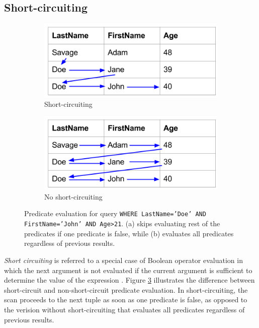 \subsection{Short-circuiting}
\label{sub:Short-circuiting}
\begin{figure}
  \centering
  \begin{subfigure}{0.45\textwidth}
    \includegraphics[width=\textwidth]{img/short-circuiting-1.png}
    \caption{Short-circuiting}
    \label{fig:short-circuiting-1} 
  \end{subfigure}
  \begin{subfigure}{0.45\textwidth}
    \includegraphics[width=\textwidth]{img/short-circuiting-2.png}
    \caption{No short-circuiting}
    \label{fig:short-circuiting-2} 
  \end{subfigure}
  \caption{Predicate evaluation for query \texttt{WHERE LastName='Doe' AND FirstName='John' AND Age>21}. (a) skips evaluating rest of the predicates if one predicate is false, while (b) evaluates all predicates regardless of previous results.}
  \label{fig:short-circuiting} 
\end{figure}
\textit{Short circuiting} is referred to a special case of Boolean operator evaluation in which the next argument is not evaluated if the current argument is sufficient to determine the value of the expression \cite{Wikipedia_contributors2015-rk}. Figure \ref{fig:short-circuiting} illustrates the difference between short-circuit and non-short-circuit predicate evaluation. In short-circuiting, the scan proceeds to the next tuple as soon as one predicate is false, as opposed to the verision without short-circuiting that evaluates all predicates regardless of previous results.

